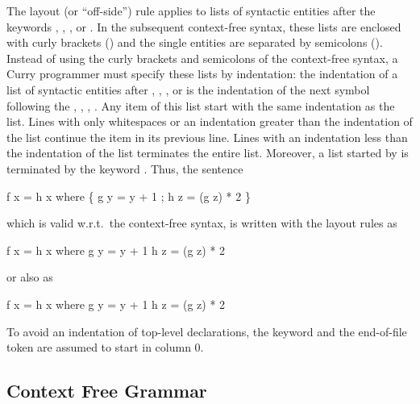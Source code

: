 The layout (or ``off-side'') rule applies to lists of syntactic
entities after the keywords ,
, , or .
In the subsequent context-free syntax,
these lists are enclosed with
curly brackets (\term{\{ \}}) and the single entities are
separated by semicolons (\term{;}). Instead of using the curly
brackets and semicolons of the context-free syntax,
a Curry programmer must specify these lists
by indentation: the indentation of a list of syntactic
entities after , , , or  is the
indentation of the next symbol following the
, , , . Any item of this list
start with the same indentation as the list. Lines with only whitespaces or
an indentation greater than the indentation of the list continue
the item in its previous line. Lines with an indentation less than
the indentation of the list terminates the entire list.
Moreover, a list started by  is terminated by the
keyword . Thus, the sentence
\begin{curry}
f x = h x where \{ g y = y + 1 ; h z = (g z) * 2 \}
\end{curry}
which is valid w.r.t.\ the context-free syntax, is written
with the layout rules as
\begin{curry}
f x = h x
 where g y = y + 1
       h z = (g z) * 2
\end{curry}
or also as
\begin{curry}
f x = h x  where
  g y = y + 1
  h z = (g z)
          * 2
\end{curry}
To avoid an indentation of top-level declarations,
the keyword  and the end-of-file token are
assumed to start in column 0.

\subsection{Context Free Grammar}

